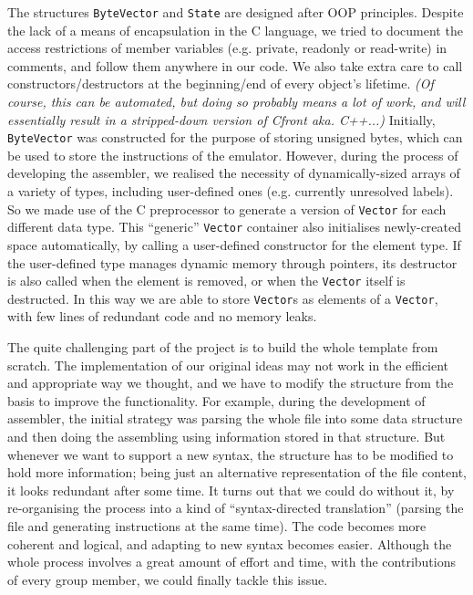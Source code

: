 \documentclass[11pt]{article}
\newcommand{\codeword}[1]{\texttt{#1}}
\begin{document}
The structures \codeword{ByteVector} and \codeword{State} are designed after OOP principles. Despite the lack of a means of encapsulation in the C language, we tried to document the access restrictions of member variables (e.g. private, readonly or read-write) in comments, and follow them anywhere in our code. We also take extra care to call constructors/destructors at the beginning/end of every object’s lifetime. \textit{(Of course, this can be automated, but doing so probably means a lot of work, and will essentially result in a stripped-down version of Cfront aka. C++...)} Initially, \codeword{ByteVector} was constructed for the purpose of storing unsigned bytes, which can be used to store the instructions of the emulator. However, during the process of developing the assembler, we realised the necessity of dynamically-sized arrays of a variety of types, including user-defined ones (e.g. currently unresolved labels). So we made use of the C preprocessor to generate a version of \codeword{Vector} for each different data type. This “generic” \codeword{Vector} container also initialises newly-created space automatically, by calling a user-defined constructor for the element type. If the user-defined type manages dynamic memory through pointers, its destructor is also called when the element is removed, or when the \codeword{Vector} itself is destructed. In this way we are able to store \codeword{Vector}s as elements of a \codeword{Vector}, with few lines of redundant code and no memory leaks.

The quite challenging part of the project is to build the whole template from scratch. The implementation of our original ideas may not work in the efficient and appropriate way we thought, and we have to modify the structure from the basis to improve the functionality.  For example, during the development of assembler, the initial strategy was parsing the whole file into some data structure and then doing the assembling using information stored in that structure. But whenever we want to support a new syntax, the structure has to be modified to hold more information; being just an alternative representation of the file content, it looks redundant after some time. It turns out that we could do without it, by re-organising the process into a kind of “syntax-directed translation” (parsing the file and generating instructions at the same time). The code becomes more coherent and logical, and adapting to new syntax becomes easier. Although the whole process involves a great amount of effort and time, with the contributions of every group member, we could finally tackle this issue.
\end{document}
